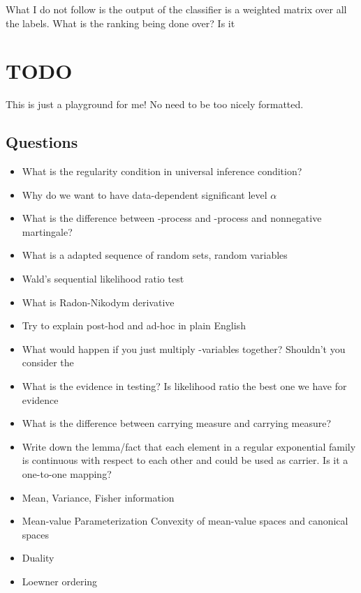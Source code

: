 What I do not follow is the output of the classifier is a weighted matrix over all the labels.
What is the ranking being done over? Is it 


\section{TODO}
This is just a playground for me! No need to be too nicely formatted.

\subsection{Questions}

\begin{itemize}
    \item What is the regularity condition in universal inference condition?
    \item Why do we want to have data-dependent significant level $\alpha$
    \item What is the difference between \p-process and \E-process and nonnegative martingale? 
    \item What is a adapted sequence of random sets, random variables
    \item Wald's sequential likelihood ratio test
    \item What is Radon-Nikodym derivative 
    \item Try to explain post-hod and ad-hoc in plain English
    \item What would happen if you just multiply \E-variables together? Shouldn't you consider the 
    \item What is the evidence in testing? Is likelihood ratio the best one we have for evidence 
\end{itemize}

\begin{itemize}
    \item What is the difference between carrying measure and carrying measure?
    \item Write down the lemma/fact that each element in a regular exponential family is continuous 
    with respect to each other and could be used as carrier. Is it a one-to-one mapping?
    \item Mean, Variance, Fisher information
    \item Mean-value Parameterization Convexity of mean-value spaces and canonical spaces
    \item Duality
    \item Loewner ordering
\end{itemize}

